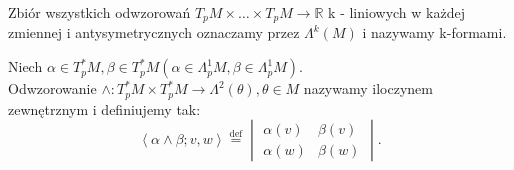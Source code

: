 \documentclass[../main.tex]{subfiles}
\begin{document}
    \pagebreak
    \begin{definicja}
        Zbiór wszystkich odwzorowań $T_pM \times \ldots \times T_pM \to \mathbb{R}$ k - liniowych w każdej zmiennej i antysymetrycznych oznaczamy przez $\Lambda^k(M)$ i nazywamy k-formami.
    \end{definicja}
    \begin{definicja}
        Niech $\alpha\in T_p^*M, \beta\in T_p^*M ( \alpha\in \Lambda_p^1 M, \beta \in \Lambda_p^1 M )$.\\
        Odwzorowanie $\land : T_p^* M \times T_p^* M \to \Lambda^2(\theta), \theta\in M$ nazywamy iloczynem zewnętrznym i definiujemy tak:
        \[
            \left<\alpha\land\beta;v,w \right> \overset{\text{def}}{=} \begin{vmatrix}\alpha(v)&\beta(v)\\ \alpha(w)&\beta(w) \end{vmatrix}
        .\]
    \end{definicja}
\end{document}
